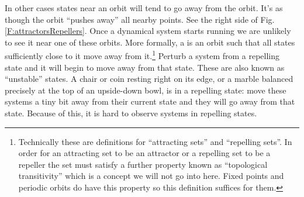  In other cases states near an orbit will tend to go away from the orbit.
It's as though the orbit ``pushes away'' all nearby points. See the right side of Fig. \ref{F:attractorsRepellers}. Once a dynamical system starts running we are unlikely to see it near one of these 
orbits. More formally, a  is an orbit such that all states sufficiently close 
to it move away from it.\footnote{Technically these are definitions for 
``attracting sets'' and ``repelling sets''. In order for an attracting set to 
be an attractor or a repelling set to be a repeller the set must satisfy a 
further property known as ``topological transitivity'' which is a concept we
will not go into here. Fixed points and periodic orbits do have this property 
so this definition suffices for them.}  Perturb a system from a repelling state and it will begin to move away from that state. These are also known as ``unstable'' states. A chair or coin resting right on its edge, or a marble balanced precisely at the top of an upside-down bowl, is in a repelling state: move these systems a tiny bit away from their current state and they will go away from that state. Because of this, it is hard to observe systems in repelling states.

